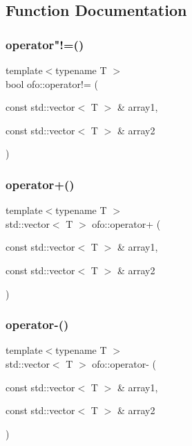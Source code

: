 \subsection{Function Documentation}
\mbox{\label{namespaceofo_a9746f36ff374ab6299fb0f990e0e0e83}} 
\subsubsection{\texorpdfstring{operator"!=()}{operator!=()}}
{\footnotesize\ttfamily template$<$typename T $>$ \\
bool ofo\+::operator!= (\begin{DoxyParamCaption}\item[{const std\+::vector$<$ T $>$ \&}]{array1,  }\item[{const std\+::vector$<$ T $>$ \&}]{array2 }\end{DoxyParamCaption})}

\mbox{\label{namespaceofo_acbaf18732443a853d482cebefb9f6e98}} 
\subsubsection{\texorpdfstring{operator+()}{operator+()}}
{\footnotesize\ttfamily template$<$typename T $>$ \\
std\+::vector$<$ T $>$ ofo\+::operator+ (\begin{DoxyParamCaption}\item[{const std\+::vector$<$ T $>$ \&}]{array1,  }\item[{const std\+::vector$<$ T $>$ \&}]{array2 }\end{DoxyParamCaption})}

\mbox{\label{namespaceofo_acb123ddb76ace937baf29a4b6f2fcd8a}} 
\subsubsection{\texorpdfstring{operator-\/()}{operator-()}\hspace{0.1cm}{\footnotesize\ttfamily [1/2]}}
{\footnotesize\ttfamily template$<$typename T $>$ \\
std\+::vector$<$ T $>$ ofo\+::operator-\/ (\begin{DoxyParamCaption}\item[{const std\+::vector$<$ T $>$ \&}]{array1,  }\item[{const std\+::vector$<$ T $>$ \&}]{array2 }\end{DoxyParamCaption})}

